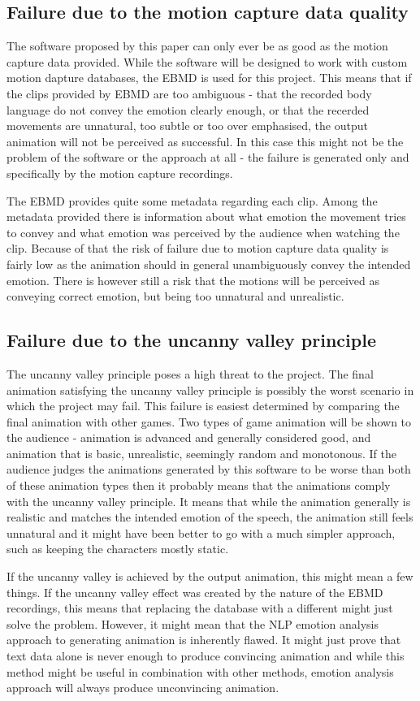 \subsection{Failure due to the motion capture data quality}
The software proposed by this paper can only ever be as good as the motion capture data provided. While the software will be designed to work with custom motion dapture databases, the EBMD is used for this project. This means that if the clips provided by EBMD are too ambiguous - that the recorded body language do not convey the emotion clearly enough, or that the recerded movements are unnatural, too subtle or too over emphasised, the output animation will not be perceived as successful. In this case this might not be the problem of the software or the approach at all - the failure is generated only and specifically by the motion capture recordings.

The EBMD provides quite some metadata regarding each clip. Among the metadata provided there is information about what emotion the movement tries to convey and what emotion was perceived by the audience when watching the clip. Because of that the risk of failure due to motion capture data quality is fairly low as the animation should in general unambiguously convey the intended emotion. There is however still a risk that the motions will be perceived as conveying correct emotion, but being too unnatural and unrealistic.

\bigskip
\subsection{Failure due to the uncanny valley principle}
The uncanny valley principle poses a high threat to the project. The final animation satisfying the uncanny valley principle is possibly the worst scenario in which the project may fail. This failure is easiest determined by comparing the final animation with other games. Two types of game animation will be shown to the audience - animation is advanced and generally considered good, and animation that is basic, unrealistic, seemingly random and monotonous. If the audience judges the animations generated by this software to be worse than both of these animation types then it probably means that the animations comply with the uncanny valley principle. It means that while the animation generally is realistic and matches the intended emotion of the speech, the animation still feels unnatural and it might have been better to go with a much simpler approach, such as keeping the characters mostly static.

If the uncanny valley is achieved by the output animation, this might mean a few things. If the uncanny valley effect was created by the nature of the EBMD recordings, this means that replacing the database with a different might just solve the problem. However, it might mean that the NLP emotion analysis approach to generating animation is inherently flawed. It might just prove that text data alone is never enough to produce convincing animation and while this method might be useful in combination with other methods, emotion analysis approach will always produce unconvincing animation.



